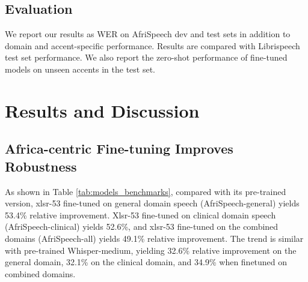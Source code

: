 \documentclass[11pt,a4paper]{article}
\begin{document}
\subsection{Evaluation}
We report our results as WER on AfriSpeech dev and test sets in addition to domain and accent-specific performance. Results are compared with Librispeech \citep{panayotov2015librispeech} test set performance. We also report the zero-shot performance of fine-tuned models on unseen accents in the test set. 



\section{Results and Discussion}

\subsection{Africa-centric Fine-tuning Improves Robustness} 
As shown in Table \ref{tab:models_benchmarks}, compared with its pre-trained version, xlsr-53 fine-tuned on general domain speech (AfriSpeech-general) yields 53.4\% relative improvement. Xlsr-53 fine-tuned on clinical domain speech (AfriSpeech-clinical) yields 52.6\%, and xlsr-53 fine-tuned on the combined domains (AfriSpeech-all) yields 49.1\% relative improvement. The trend is similar with pre-trained Whisper-medium, yielding 32.6\% relative improvement on the general domain, 32.1\% on the clinical domain, and 34.9\% when finetuned on combined domains. %
\end{document}
